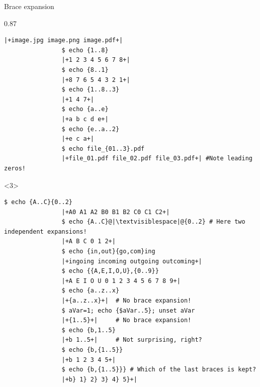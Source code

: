 \begin{frame}[fragile]{Brace expansion}
\begin{overlayarea}{\textwidth}{0.87\textheight}
\begin{onlyenv}
\begin{lstlisting}[style=MyBash, style=oddnumbers, aboveskip=2mm]
                |+image.jpg image.png image.pdf+|
                $ echo {1..8}
                |+1 2 3 4 5 6 7 8+|
                $ echo {8..1}
                |+8 7 6 5 4 3 2 1+|
                $ echo {1..8..3}
                |+1 4 7+|
                $ echo {a..e}
                |+a b c d e+|
                $ echo {e..a..2}
                |+e c a+|
                $ echo file_{01..3}.pdf
                |+file_01.pdf file_02.pdf file_03.pdf+| #Note leading zeros!
            \end{lstlisting}
        \end{onlyenv}
        \begin{onlyenv}<3>
            \begin{lstlisting}[style=MyBash, style=oddnumbers, aboveskip=2mm, firstnumber=18]
                $ echo {A..C}{0..2}
                |+A0 A1 A2 B0 B1 B2 C0 C1 C2+|
                $ echo {A..C}@|\textvisiblespace|@{0..2} # Here two independent expansions!
                |+A B C 0 1 2+|
                $ echo {in,out}{go,com}ing
                |+ingoing incoming outgoing outcoming+|
                $ echo {{A,E,I,O,U},{0..9}}
                |+A E I O U 0 1 2 3 4 5 6 7 8 9+|
                $ echo {a..z..x}
                |+{a..z..x}+|  # No brace expansion!
                $ aVar=1; echo {$aVar..5}; unset aVar
                |+{1..5}+|     # No brace expansion!
                $ echo {b,1..5}
                |+b 1..5+|     # Not surprising, right?
                $ echo {b,{1..5}}
                |+b 1 2 3 4 5+|
                $ echo {b,{1..5}}} # Which of the last braces is kept?
                |+b} 1} 2} 3} 4} 5}+|
            \end{lstlisting}
        \end{onlyenv}
    \end{overlayarea}
\end{frame}

